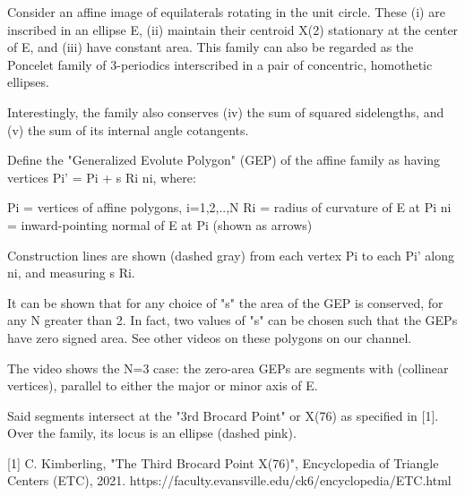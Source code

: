 Consider an affine image of equilaterals rotating in the unit circle. These (i) are inscribed in an ellipse E, (ii) maintain their centroid X(2) stationary at the center of E, and (iii) have constant area. This family can also be regarded as the Poncelet family of 3-periodics interscribed in a pair of concentric, homothetic ellipses.

Interestingly, the family also conserves (iv) the sum of squared sidelengths, and (v) the sum of its internal angle cotangents.

Define the "Generalized Evolute Polygon" (GEP) of the affine family as having vertices Pi' = Pi + s Ri ni, where:

Pi = vertices of affine polygons, i=1,2,..,N
Ri = radius of curvature of E at Pi
ni = inward-pointing normal of E at Pi (shown as arrows)

Construction lines are shown (dashed gray) from each vertex Pi to each Pi' along ni, and measuring s Ri.

It can be shown that for any choice of "s" the area of the GEP is conserved, for any N greater than 2. In fact,  two values of "s" can be chosen such that the GEPs have zero signed area. See other videos on these polygons on our channel.

The video shows the N=3 case: the zero-area GEPs are segments with (collinear vertices), parallel to either the major or minor axis of E.

Said segments intersect at the "3rd Brocard Point" or X(76) as specified in [1]. Over the family, its locus is an ellipse (dashed pink).

[1] C. Kimberling, "The Third Brocard Point X(76)", Encyclopedia of Triangle Centers (ETC), 2021. https://faculty.evansville.edu/ck6/encyclopedia/ETC.html